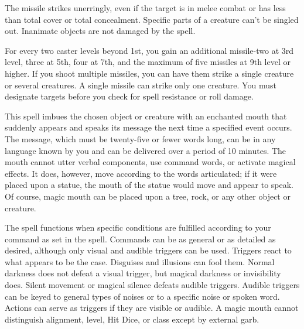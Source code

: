 \begin{multicols}{2}
\begin{small}
\smallskip\noindent The missile strikes unerringly, even if the target is in melee combat or has less than total cover or total concealment. Specific parts of a creature can't be singled out. Inanimate objects are not damaged by the spell.

\smallskip\noindent For every two caster levels beyond 1st, you gain an additional missile-two at 3rd level, three at 5th, four at 7th, and the maximum of five missiles at 9th level or higher. If you shoot multiple missiles, you can have them strike a single creature or several creatures. A single missile can strike only one creature. You must designate targets before you check for spell resistance or roll damage.

\noindent This spell imbues the chosen object or creature with an enchanted mouth that suddenly appears and speaks its message the next time a specified event occurs. The message, which must be twenty-five or fewer words long, can be in any language known by you and can be delivered over a period of 10 minutes. The mouth cannot utter verbal components, use command words, or activate magical effects. It does, however, move according to the words articulated; if it were placed upon a statue, the mouth of the statue would move and appear to speak. Of course, magic mouth can be placed upon a tree, rock, or any other object or creature.

\smallskip\noindent The spell functions when specific conditions are fulfilled according to your command as set in the spell. Commands can be as general or as detailed as desired, although only visual and audible triggers can be used. Triggers react to what appears to be the case. Disguises and illusions can fool them. Normal darkness does not defeat a visual trigger, but magical darkness or invisibility does. Silent movement or magical silence defeats audible triggers. Audible triggers can be keyed to general types of noises or to a specific noise or spoken word. Actions can serve as triggers if they are visible or audible. A magic mouth cannot distinguish alignment, level, Hit Dice, or class except by external garb.


\end{small}
\end{multicols}
